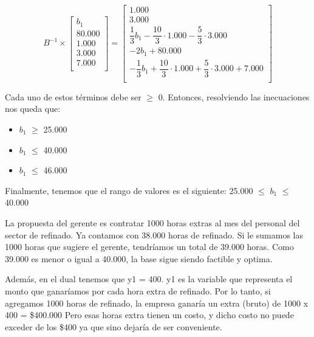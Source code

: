 \documentclass[10pt,a4paper]{article}
\begin{document}
\begin{enumerate}[label=\textbf{\sffamily\large\arabic*.}]
    \[
B^{-1} \times 
\begin{bmatrix}
    b_1 \\
    80{.}000 \\
    1{.}000  \\
    3{.}000  \\
    7{.}000  \\
\end{bmatrix}
=
\begin{bmatrix}
    1{.}000 \\
    3{.}000 \\
    \dfrac{1}{3} b_1 - \dfrac{10}{3} \cdot 1{.}000 - \dfrac{5}{3} \cdot 3{.}000 \\
    -2b_1 +80{.}000  \\
    -\dfrac{1}{3} b_1 + \dfrac{10}{3} \cdot 1{.}000 + \dfrac{5}{3} \cdot 3{.}000 + 7{.}000\\
\end{bmatrix}
\]

    

    \vspace{1em}
    Cada uno de estos términos debe ser $\geq$ 0. Entonces, resolviendo las inecuaciones nos queda que: 
    \begin{itemize}

        \item $b_1$ $\geq$ 25.000
        \item $b_1$ $\leq$ 40.000
        \item $b_1$ $\leq$ 46.000
        
    \end{itemize}
    
    Finalmente, tenemos que el rango de valores es el siguiente: 25.000 $\leq$ $b_1$ $\leq$ 40.000

    \vspace{1em}

La propuesta del gerente es contratar 1000 horas extras al mes del personal del sector de refinado. Ya contamos con 38.000 horas de refinado. Si le sumamos las 1000 horas que sugiere el gerente, tendríamos un total de 39.000 horas. Como 39.000 es menor o igual a 40.000, la base sigue siendo factible y optima.
    \vspace{1em}
    
Además, en el dual tenemos que y1 = 400. \newline
 y1 es la variable que representa el monto que ganaríamos por cada hora extra de refinado.
Por lo tanto, si agregamos 1000 horas de refinado, la empresa ganaría un extra (bruto) de 1000 x 400 = \$400.000
Pero esas horas extra tienen un costo, y dicho costo no puede exceder de los \$400 ya que sino dejaría de ser conveniente.
    

\end{enumerate}
\end{document}
